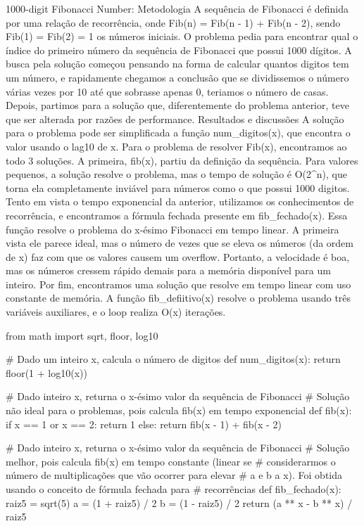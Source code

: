     1000-digit Fibonacci Number:
        Metodologia
            A sequência de Fibonacci é definida por uma relação de recorrência, onde Fib(n) = Fib(n - 1) + Fib(n - 2), sendo Fib(1) = Fib(2) = 1 os números iniciais.
            O problema pedia para encontrar qual o índice do primeiro número da sequência de Fibonacci que possui 1000 dígitos.
            A busca pela solução começou pensando na forma de calcular quantos digitos tem um número, e rapidamente chegamos a conclusão que se dividissemos o número várias vezes por 10 até que sobrasse apenas 0, teriamos o número de casas. Depois, partimos para a solução que, diferentemente do problema anterior, teve que ser alterada por razões de performance.
        Resultados e discussões
            A solução para o problema pode ser simplificada a função num_digitos(x), que encontra o valor usando o lag10 de x. Para o problema de resolver Fib(x), encontramos ao todo 3 soluções.
            A primeira, fib(x), partiu da definição da sequência. Para valores pequenos, a solução resolve o problema, mas o tempo de solução é O(2^n), que torna ela completamente inviável para números como o que possui 1000 digitos.
            Tento em vista o tempo exponencial da anterior, utilizamos os conhecimentos de recorrência, e encontramos a fórmula fechada presente em fib_fechado(x). Essa função resolve o problema do x-ésimo Fibonacci em tempo linear. A primeira vista ele parece ideal, mas o número de vezes que se eleva os números (da ordem de x) faz com que os valores causem um overflow. Portanto, a velocidade é boa, mas os números cressem rápido demais para a memória disponível para um inteiro.
            Por fim, encontramos uma solução que resolve em tempo linear com uso constante de memória. A função fib_defiitivo(x) resolve o problema usando três variáveis auxiliares, e o loop realiza O(x) iterações.

            from math import sqrt, floor, log10

            # Dado um inteiro x, calcula o número de digitos
            def num_digitos(x):
                return floor(1 + log10(x))

            # Dado inteiro x, returna o x-ésimo valor da sequência de Fibonacci
            # Solução não ideal para o problemas, pois calcula fib(x) em tempo exponencial
            def fib(x):
                if x == 1 or x == 2:
                    return 1
                else:
                    return fib(x - 1) + fib(x - 2) 

            # Dado inteiro x, returna o x-ésimo valor da sequência de Fibonacci
            # Solução melhor, pois calcula fib(x) em tempo constante (linear se 
            # considerarmos o número de multiplicações que vão ocorrer para elevar
            # a e b a x). Foi obtida usando o conceito de fórmula fechada para 
            # recorrências
            def fib_fechado(x):
                raiz5 = sqrt(5)
                a = (1 + raiz5) / 2
                b = (1 - raiz5) / 2
                return (a ** x - b ** x) / raiz5

